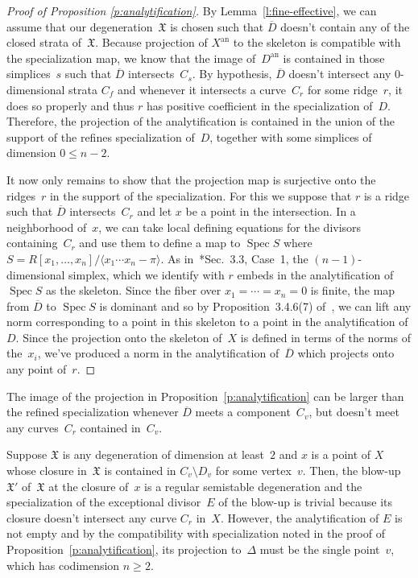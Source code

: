 \documentclass[11pt]{amsart}
\theoremstyle{definition}
\newcommand{\Spec}{\operatorname{Spec}}
\newcommand{\X}{\mathfrak X}
\begin{document}
\begin{proof}[Proof of Proposition \ref{p:analytification}]
By Lemma~\ref{l:fine-effective}, we can assume that our degeneration~$\X$ is
chosen such that $\overline D$ doesn't contain any of the closed strata of~$\X$.
Because projection of $X^{\operatorname{an}}$
to the skeleton is compatible with the specialization map, we know that the
image of~$D^{\operatorname{an}}$ is contained in those simplices~$s$ such that $\overline D$
intersects~$C_s$. By hypothesis, $\overline D$ doesn't intersect any
$0$-dimensional strata
$C_f$ and whenever it intersects a curve~$C_r$ for some ridge~$r$, it does so
properly and thus $r$ has positive coefficient in the specialization of~$D$.
Therefore, the projection of the analytification is contained in the union of
the support of the refines specialization of~$D$,
together with some simplices of dimension $0 \leq n-2$.

It now only remains to show that the projection map is surjective onto the
ridges~$r$ in the support of the specialization. For this we suppose that $r$ is
a ridge such that $\overline D$ intersects~$C_r$ and let $x$ be a point in the
intersection. In a neighborhood of~$x$, we can take local defining equations for
the divisors containing~$C_r$ and use them to define a map to $\Spec S$ where $S
= R[x_1, \ldots, x_{n}] / \langle x_1 \cdots x_{n} - \pi \rangle$. As
in~\cite{nicaise}*{Sec.~3.3, Case~1}, the $(n-1)$-dimensional simplex, which we
identify with $r$ embeds in the analytification of $\Spec S$ as the skeleton.
Since the fiber over $x_1 = \cdots = x_n = 0$ is finite, the map from $\overline
D$ to $\Spec S$ is dominant and so by Proposition~3.4.6(7) of~\cite{berkovich},
we can lift any norm corresponding to a point in this skeleton to a point in the
analytification of $D$. Since the projection onto the skeleton of~$X$ is
defined in terms of the norms of the~$x_i$, we've produced a norm in the
analytification of~$\overline D$ which projects onto any point of~$r$.
\end{proof}

The image of the projection in Proposition~\ref{p:analytification} can be
larger than the refined specialization whenever $\overline D$ meets a
component~$C_v$, but doesn't meet any curves~$C_r$ contained in~$C_v$.

\begin{ex}\label{ex:blow-up}
Suppose $\X$ is any degeneration of dimension at least~$2$ and $x$ is a
point of $X$ whose closure in~$\X$ is contained in $C_v \setminus D_v$ for
some vertex~$v$. Then, the blow-up~$\X'$ of~$\X$ at the closure of~$x$ is a
regular semistable degeneration and the specialization of the exceptional
divisor~$E$ of the blow-up is trivial because its closure doesn't intersect any
curve $C_r$ in~$X$. However, the analytification of $E$ is not
empty and by the compatibility with specialization noted in the proof of
Proposition~\ref{p:analytification}, its projection to~$\Delta$ must be the
single point~$v$, which has codimension $n \geq 2$.
\end{ex}
\end{document}
